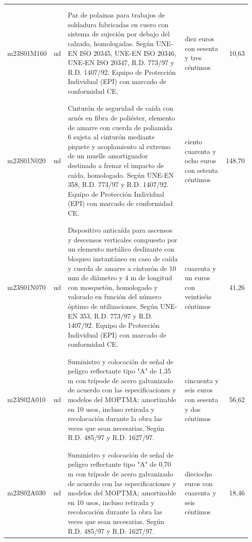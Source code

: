 \documentclass{book}%
\begin{document}
\begin{longtable}{|l|l|p{5cm}|p{3cm}|r|}
&&&&\\%
&&&&\\%
m23S01M160&ud&Par de polainas para trabajos de soldadura fabricadas en cuero con sistema de sujeción por debajo del calzado, homologadas. Según UNE{-}EN ISO 20345, UNE{-}EN ISO 20346, UNE{-}EN ISO 20347, R.D. 773/97 y R.D. 1407/92. Equipo de Protección Individual (EPI) con marcado de conformidad CE.&diez euros con sesenta y tres céntimos&10,63\\%
&&&&\\%
&&&&\\%
m23S01N020&ud&Cinturón de seguridad de caída con arnés en fibra de poliéster, elemento de amarre con cuerda de poliamida 6 sujeta al cinturón mediante piquete y acoplamiento al extremo de un muelle amortiguador destinado a frenar el impacto de caída, homologado. Según UNE{-}EN 358, R.D. 773/97 y R.D. 1407/92. Equipo de Protección Individual (EPI) con marcado de conformidad CE.&ciento cuarenta y ocho euros con setenta céntimos&148,70\\%
&&&&\\%
&&&&\\%
m23S01N070&ud&Dispositivo anticaída para ascensos y descensos verticales compuesto por un elemento metálico deslizante con bloqueo instantáneo en caso de caída y cuerda de amarre a cinturón de 10 mm de diámetro y 4 m de longitud con mosquetón, homologado y valorado en función del número óptimo de utilizaciones. Según UNE{-}EN 353, R.D. 773/97 y R.D. 1407/92. Equipo de Protección Individual (EPI) con marcado de conformidad CE.&cuarenta y un euros con veintiséis céntimos&41,26\\%
&&&&\\%
&&&&\\%
m23S02A010&ud&Suministro y colocación de señal de peligro reflectante tipo "A" de 1,35 m con trípode de acero galvanizado de acuerdo con las especificaciones y modelos del MOPTMA; amortizable en 10 usos, incluso retirada y recolocación durante la obra las veces que sean necesarias. Según R.D. 485/97 y R.D. 1627/97.&cincuenta y seis euros con sesenta y dos céntimos&56,62\\%
&&&&\\%
&&&&\\%
m23S02A030&ud&Suministro y colocación de señal de peligro reflectante tipo "A" de 0,70 m con trípode de acero galvanizado de acuerdo con las especificaciones y modelos del MOPTMA; amortizable en 10 usos, incluso retirada y recolocación durante la obra las veces que sean necesarias. Según R.D. 485/97 y R.D. 1627/97.&dieciocho euros con cuarenta y seis céntimos&18,46\\%

\end{longtable}
\end{document}
